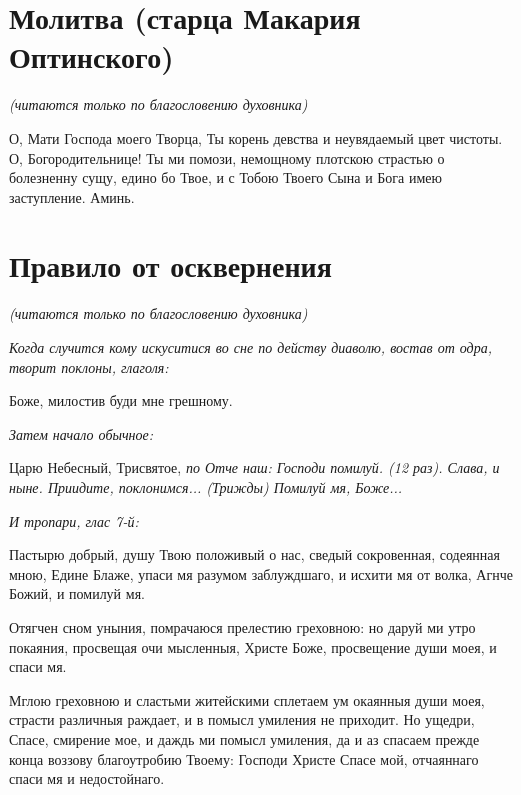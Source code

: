 \section{Молитва (старца Макария Оптинского)}
 


\itshape (читаются только по благословению духовника)

\normalfont{}


О, Мати Господа моего Творца, Ты корень девства и неувядаемый цвет чистоты. О, Богородительнице! Ты ми помози, немощному плотскою страстью о болезненну сущу, едино бо Твое, и с Тобою Твоего Сына и Бога имею заступление. Аминь.





\section{Правило от осквернения}
 


\itshape (читаются только по благословению духовника)\normalfont{}


\itshape Когда случится кому искуситися во сне по действу диаволю, востав от одра, творит поклоны, глаголя: 

\normalfont{}

Боже, милостив буди мне грешному.


\itshape Затем начало обычное: 

\normalfont{}Царю Небесный, Трисвятое, \itshape по\normalfont{} Отче наш: Господи помилуй. (12 раз). Слава, и ныне. Приидите, поклонимся... (\itshape Трижды\normalfont{}) Помилуй мя, Боже...


\itshape И тропари, глас 7-й: \normalfont{}

Пастырю добрый, душу Твою положивый о нас, сведый сокровенная, содеянная мною, Едине Блаже, упаси мя разумом заблуждшаго, и исхити мя от волка, Агнче Божий, и помилуй мя. 


Отягчен сном уныния, помрачаюся прелестию греховною: но даруй ми утро покаяния, просвещая очи мысленныя, Христе Боже, просвещение души моея, и спаси мя. 


Мглою греховною и сластьми житейскими сплетаем ум окаянныя души моея, страсти различныя раждает, и в помысл умиления не приходит. Но ущедри, Спасе, смирение мое, и даждь ми помысл умиления, да и аз спасаем прежде конца воззову благоутробию Твоему: Господи Христе Спасе мой, отчаяннаго спаси мя и недостойнаго. 


